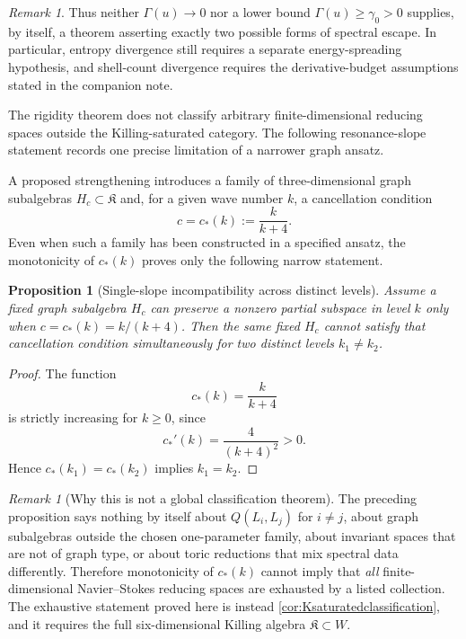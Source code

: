 \documentclass[
 aps,
 prd,
 reprint,
 amsmath,
 amssymb,
 nofootinbib,
 superscriptaddress
]{revtex4-2}
\newtheorem{proposition}[theorem]{Proposition}
\theoremstyle{definition}
\theoremstyle{remark}
\newtheorem{remark}[theorem]{Remark}
\newcommand{\cK}{\mathfrak K}
\begin{document}
\begin{remark}
Thus neither $\Gamma(u)\to0$ nor a lower bound
$\Gamma(u)\ge\gamma_0>0$ supplies, by itself, a theorem asserting exactly two
possible forms of spectral escape.  In particular, entropy divergence still
requires a separate energy-spreading hypothesis, and shell-count divergence
requires the derivative-budget assumptions stated in the companion note.
\end{remark}

The rigidity theorem does not classify arbitrary finite-dimensional reducing
spaces outside the Killing-saturated category. The following resonance-slope
statement records one precise limitation of a narrower graph ansatz.
\label{sec:resonance-analysis}

A proposed strengthening introduces a family of three-dimensional graph
subalgebras $H_c\subset\cK$ and, for a given wave number $k$, a cancellation
condition
\[
 c=c_*(k):=\frac{k}{k+4}.
\]
Even when such a family has been constructed in a specified ansatz, the
monotonicity of $c_*(k)$ proves only the following narrow statement.

\begin{proposition}[Single-slope incompatibility across distinct levels]
\label{prop:singleslope}
Assume a fixed graph subalgebra $H_c$ can preserve a nonzero partial
subspace in level $k$ only when $c=c_*(k)=k/(k+4)$.  Then the same fixed
$H_c$ cannot satisfy that cancellation condition simultaneously for two
distinct levels $k_1\ne k_2$.
\end{proposition}

\begin{proof}
The function
\[
 c_*(k)=\frac{k}{k+4}
\]
is strictly increasing for $k\ge0$, since
\[
 c_*'(k)=\frac4{(k+4)^2}>0.
\]
Hence $c_*(k_1)=c_*(k_2)$ implies $k_1=k_2$.
\end{proof}

\begin{remark}[Why this is not a global classification theorem]
\label{rem:notglobalclass}
The preceding proposition says nothing by itself about
$Q(L_i,L_j)$ for $i\ne j$, about graph subalgebras outside the chosen
one-parameter family, about invariant spaces that are not of graph type, or
about toric reductions that mix spectral data differently.  Therefore
monotonicity of $c_*(k)$ cannot imply that \emph{all} finite-dimensional
Navier--Stokes reducing spaces are exhausted by a listed collection.
The exhaustive statement proved here is instead
\cref{cor:Ksaturatedclassification}, and it requires the full six-dimensional
Killing algebra $\cK\subset W$.
\end{remark}
\end{document}
